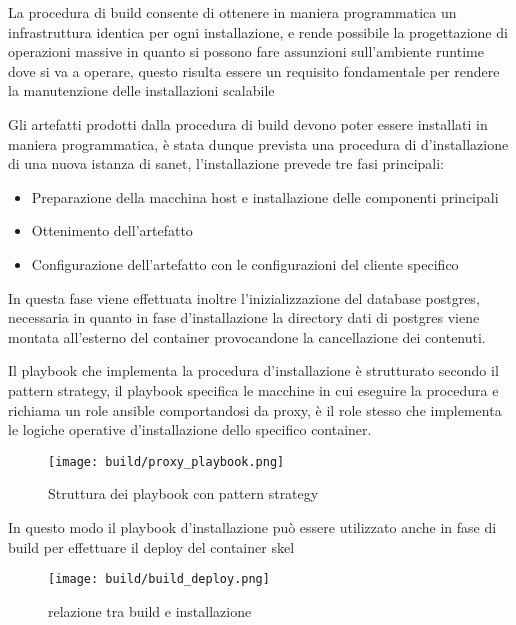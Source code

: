 La procedura di build consente di ottenere in maniera programmatica un infrastruttura identica per ogni installazione, e rende possibile la progettazione di operazioni massive in quanto si possono fare assunzioni sull'ambiente runtime dove si va a operare, questo risulta essere un requisito fondamentale per rendere la manutenzione delle installazioni scalabile

Gli artefatti prodotti dalla procedura di build devono poter essere installati in maniera programmatica, è stata dunque prevista una procedura di d'installazione di una nuova istanza di sanet, l'installazione prevede tre fasi principali:

\begin{itemize}
  \item{Preparazione della macchina host e installazione delle componenti principali}
  \item{Ottenimento dell'artefatto}
  \item{Configurazione dell'artefatto con le configurazioni del cliente specifico}
\end{itemize}

In questa fase viene effettuata inoltre l'inizializzazione del database postgres, necessaria in quanto in fase d'installazione la directory dati di postgres viene montata all'esterno del container provocandone la cancellazione dei contenuti.

Il playbook che implementa la procedura d'installazione è strutturato secondo il pattern strategy, il playbook specifica le macchine in cui eseguire la procedura e richiama un role ansible comportandosi da proxy, è il role stesso che implementa le logiche operative d'installazione dello specifico container.

\begin{figure}[H]
    \centering
    \texttt{[image: build/proxy\_playbook.png]}
    \caption{Struttura dei playbook con pattern strategy}
    \label{fig:proxy_playbook}
\end{figure}

In questo modo il playbook d'installazione può essere utilizzato anche in fase di build per effettuare il deploy del container skel

\begin{figure}[H]
    \centering
    \texttt{[image: build/build\_deploy.png]}
    \caption{relazione tra build e installazione}
    \label{fig:build_deploy}
\end{figure}

